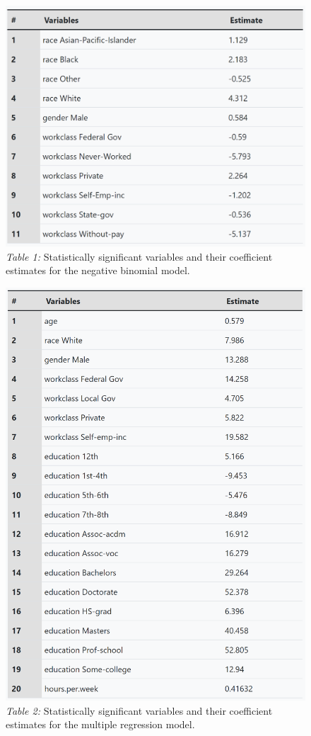 \documentclass[11pt,regno]{amsart}
\theoremstyle{plain}
\numberwithin{equation}{section}
\begin{document}
\begin{figure}[h!]  
\caption*{\textit{Table 1:} Statistically significant variables and their coefficient estimates for the negative binomial model.}
\includegraphics[scale = 0.4]{assignment6/tablesest2.png} 
\end{figure}

\begin{figure}[h!]  
\caption*{\textit{Table 2:} Statistically significant variables and their coefficient estimates for the multiple regression model.}
\includegraphics[scale = 0.6]{assignment6/tablesEstimates.png} 
\end{figure}
\end{document}
